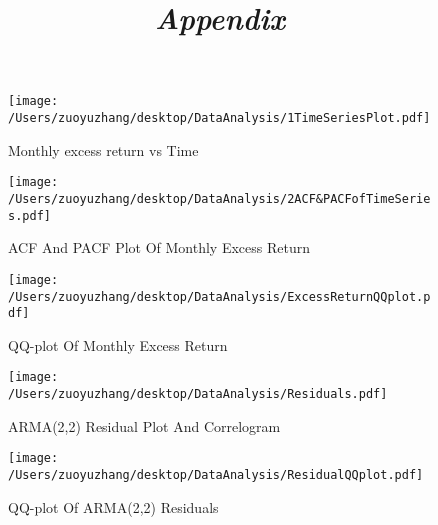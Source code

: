 \documentclass[10pt,letter]{article}
\begin{document}
\clearpage
\appendix
\center
\title{\huge{\em{Appendix}}}
\begin{figure}[H]
    \centering
    \texttt{[image: /Users/zuoyuzhang/desktop/DataAnalysis/1TimeSeriesPlot.pdf]}
    \caption{Monthly excess return vs Time}
    \label{fig}
\end{figure}

\begin{figure}[H]
    \centering
    \texttt{[image: /Users/zuoyuzhang/desktop/DataAnalysis/2ACF\&PACFofTimeSeries.pdf]}
    \caption{ACF And PACF Plot Of Monthly Excess Return}
    \label{fig}
	\end{figure}

	\begin{figure}[H]
    \centering
    \texttt{[image: /Users/zuoyuzhang/desktop/DataAnalysis/ExcessReturnQQplot.pdf]}
    \caption{QQ-plot Of Monthly Excess Return}
    \label{fig}
	\end{figure}


	\begin{figure}[H]
    \centering
    \texttt{[image: /Users/zuoyuzhang/desktop/DataAnalysis/Residuals.pdf]}
    \caption{ARMA(2,2) Residual Plot And Correlogram}
    \label{fig}
	\end{figure}


	\begin{figure}[H]
    \centering
    \texttt{[image: /Users/zuoyuzhang/desktop/DataAnalysis/ResidualQQplot.pdf]}
    \caption{QQ-plot Of ARMA(2,2) Residuals}
    \label{fig}
	\end{figure}	
	
\end{document}
